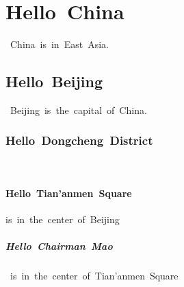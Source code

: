 \documentclass{article}
\begin{document}
\tableofcontents 
\section{Hello China} China is in East Asia.  
\subsection{Hello Beijing} Beijing is the capital of China.
\subsubsection{Hello Dongcheng District}  
\paragraph{Hello Tian'anmen Square}is in the center of Beijing  
\subparagraph{Hello Chairman Mao} is in the center of Tian'anmen Square  
\end{document}
